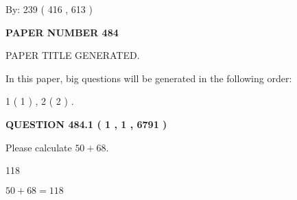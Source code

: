 \documentclass[12pt]{article}
\begin{document}
   
\hspace{1.0in} By: 
 239 ( 416 ,  613 )
   
   
   
   
\newpage 
\setcounter{page}{ 
   484001 } 
   
   
   
   
 {\textbf{ \Large{ PAPER NUMBER  484  }}}
   
   
\vspace{0.2in}
   
   
   
   
   
   
   
   
 \vspace{0.2in}
 
 
 
 
   
   
 PAPER TITLE GENERATED.
   
   
   
\vspace{0.2in}
   
In this paper, big questions will be generated in the following order: 
   
   
   1 ( 1 )
 ,
   2 ( 2 )
 .
  
\vspace{0.2in}
  
{\textbf{\Large{QUESTION
484.1 
 ( 1 , 1 , 6791 )
}}}
  
  
 
Please calculate $ %
50 +  %
68 $.
 
 
 
\noindent{}
 
 

118
 
 
\noindent{}
 
 

 
 
 
\noindent{}
 
 

$ %
50 +  %
68=   %
118$
 
 
\noindent{}
 
\end{document}
